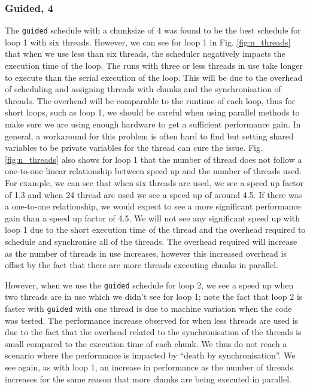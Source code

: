 \documentclass[11pt, a4paper]{article}
\begin{document}
			\subsubsection{Guided, 4}
				The \texttt{guided} schedule with a chunksize of 4 was found to be the best schedule for loop 1 with six threads. However, we can see for loop 1 in Fig. \ref{fig:n_threads} that when we use less than six threads, the scheduler negatively impacts the execution time of the loop. The runs with three or less threads in use take longer to execute than the serial execution of the loop. This will be due to the overhead of scheduling and assigning threads with chunks and the synchronisation of threads. The overhead will be comparable to the runtime of each loop, thus for short loops, such as loop 1, we should be careful when using parallel methods to make sure we are using enough hardware to get a sufficient performance gain. %
				In general, a workaround for this problem is often hard to find but setting shared variables to be private variables for the thread 
				can cure the issue. Fig. \ref{fig:n_threads} also shows for loop 1 that the number of thread does not follow a one-to-one linear relationship between speed up and the number of threads used. For example, we can see that when six threads are used, we see a speed up factor of 1.3 and when 24 thread are used we see a speed up of around 4.5. If there was a one-to-one relationship, we would expect to see a more significant performance gain than a speed up factor of 4.5. We will not see any significant speed up with loop 1 due to the short execution time of the thread and the overhead required to schedule and synchronise all of the threads. The overhead required will increase as the number of threads in use increases, however this increased overhead is offset by the fact that there are more threads executing chunks in parallel.
				
				However, when we use the \texttt{guided} schedule for loop 2, we see a speed up when two threads are in use which we didn't see for loop 1; note the fact that loop 2 is faster with \texttt{guided} with one thread is due to machine variation when the code was tested. The performance increase observed for when less threads are used is due to the fact that the overhead related to the synchronisation of the threads is small compared to the execution time of each chunk. We thus do not reach a scenario where the performance is impacted by ``death by synchronisation''.  We see again, as with loop 1, an increase in performance as the number of threads increases for the same reason that more chunks are being executed in parallel. 
			
\end{document}
